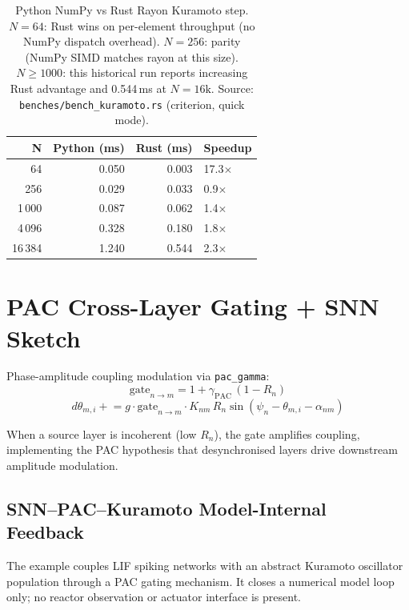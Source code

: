 \documentclass[11pt,a4paper]{article}
\begin{document}
\begin{table}[h]
\centering
\begin{tabular}{@{}rrrl@{}}
\toprule
\textbf{N} & \textbf{Python (ms)} & \textbf{Rust (ms)} & \textbf{Speedup} \\
\midrule
64     & 0.050 & 0.003 & 17.3$\times$ \\
256    & 0.029 & 0.033 & 0.9$\times$ \\
1\,000 & 0.087 & 0.062 & 1.4$\times$ \\
4\,096 & 0.328 & 0.180 & 1.8$\times$ \\
16\,384& 1.240 & 0.544 & 2.3$\times$ \\
\bottomrule
\end{tabular}
\caption{Python NumPy vs Rust Rayon Kuramoto step.
$N=64$: Rust wins on per-element throughput (no NumPy dispatch overhead).
$N=256$: parity (NumPy SIMD matches rayon at this size).
$N\geq 1000$: this historical run reports increasing Rust advantage and
0.544\,ms at $N=16\text{k}$.
Source: \texttt{benches/bench\_kuramoto.rs} (criterion, quick mode).}
\label{tab:bench}
\end{table}


\section{PAC Cross-Layer Gating + SNN Sketch}

Phase-amplitude coupling modulation via \texttt{pac\_gamma}:
\begin{equation}
  \text{gate}_{n\to m} = 1 + \gamma_{\text{PAC}}\,(1 - R_n)
\end{equation}
\begin{equation}
  d\theta_{m,i} \mathrel{+}= g \cdot \text{gate}_{n\to m} \cdot K_{nm}\,R_n
  \sin(\psi_n - \theta_{m,i} - \alpha_{nm})
\end{equation}

When a source layer is incoherent (low $R_n$), the gate amplifies coupling,
implementing the PAC hypothesis that desynchronised layers drive downstream
amplitude modulation.

\subsection{SNN--PAC--Kuramoto Model-Internal Feedback}

The example couples LIF spiking networks with an abstract Kuramoto oscillator
population through a PAC gating mechanism. It closes a numerical model loop
only; no reactor observation or actuator interface is present.
\end{document}
